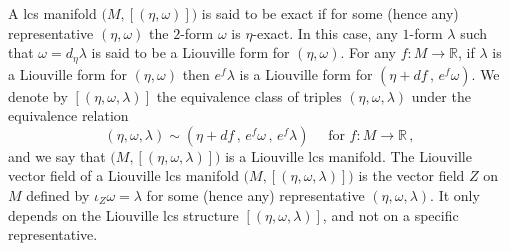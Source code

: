 \documentclass{amsart}
\theoremstyle{remark}
\begin{document}
A lcs manifold $\big(M, [(\eta, \omega)] \big)$
is said to be exact
if for some (hence any) representative $(\eta, \omega)$
the $2$-form $\omega$ is $\eta$-exact.
In this case,
any $1$-form $\lambda$ such that $\omega = d_{\eta} \lambda$
is said to be a Liouville form for $(\eta, \omega)$.
For any $f: M \rightarrow \mathbb{R}$,
if $\lambda$ is a Liouville form for $(\eta, \omega)$
then $e^f \lambda$ is a Liouville form
for $(\eta + df \,,\, e^f \omega)$.
We denote by $[(\eta, \omega, \lambda)]$
the equivalence class of triples $(\eta, \omega, \lambda)$
under the equivalence relation
\[
(\eta, \omega, \lambda) \sim (\eta + df \,,\, e^f \omega \,,\, e^f \lambda)
\quad \text{ for } f: M \rightarrow \mathbb{R} \,,
\]
and we say that $\big(M, [(\eta, \omega, \lambda)] \big)$
is a Liouville lcs manifold.
The Liouville vector field
of a Liouville lcs manifold $\big(M, [(\eta, \omega, \lambda)] \big)$
is the vector field $Z$ on $M$
defined by $\iota_{Z} \omega = \lambda$
for some (hence any) representative $(\eta, \omega, \lambda)$.
It only depends on the Liouville lcs structure $[(\eta, \omega, \lambda)]$,
and not on a specific representative.
\end{document}
